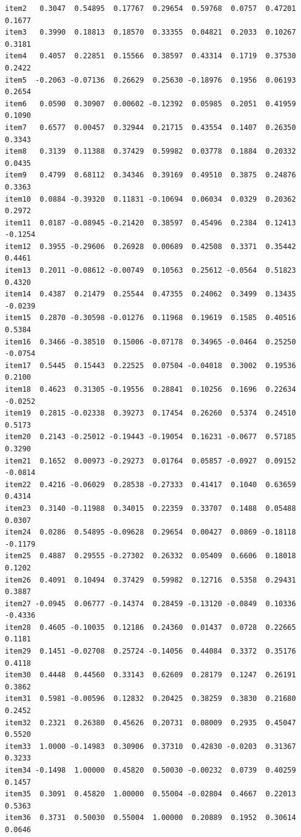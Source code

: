 \documentclass[
  a4paper,
]{ltjsbook}
\begin{document}
\begin{verbatim}
item2   0.3047  0.54895  0.17767  0.29654  0.59768  0.0757  0.47201  0.1677
item3   0.3990  0.18813  0.18570  0.33355  0.04821  0.2033  0.10267  0.3181
item4   0.4057  0.22851  0.15566  0.38597  0.43314  0.1719  0.37530  0.2422
item5  -0.2063 -0.07136  0.26629  0.25630 -0.18976  0.1956  0.06193  0.2654
item6   0.0590  0.30907  0.00602 -0.12392  0.05985  0.2051  0.41959  0.1090
item7   0.6577  0.00457  0.32944  0.21715  0.43554  0.1407  0.26350  0.3343
item8   0.3139  0.11388  0.37429  0.59982  0.03778  0.1884  0.20332  0.0435
item9   0.4799  0.68112  0.34346  0.39169  0.49510  0.3875  0.24876  0.3363
item10  0.0884 -0.39320  0.11831 -0.10694  0.06034  0.0329  0.20362  0.2972
item11  0.0187 -0.08945 -0.21420  0.38597  0.45496  0.2384  0.12413 -0.1254
item12  0.3955 -0.29606  0.26928  0.00689  0.42508  0.3371  0.35442  0.4461
item13  0.2011 -0.08612 -0.00749  0.10563  0.25612 -0.0564  0.51823  0.4320
item14  0.4387  0.21479  0.25544  0.47355  0.24062  0.3499  0.13435 -0.0239
item15  0.2870 -0.30598 -0.01276  0.11968  0.19619  0.1585  0.40516  0.5384
item16  0.3466 -0.38510  0.15006 -0.07178  0.34965 -0.0464  0.25250 -0.0754
item17  0.5445  0.15443  0.22525  0.07504 -0.04018  0.3002  0.19536  0.2100
item18  0.4623  0.31305 -0.19556  0.28841  0.10256  0.1696  0.22634 -0.0252
item19  0.2815 -0.02338  0.39273  0.17454  0.26260  0.5374  0.24510  0.5173
item20  0.2143 -0.25012 -0.19443 -0.19054  0.16231 -0.0677  0.57185  0.3290
item21  0.1652  0.00973 -0.29273  0.01764  0.05857 -0.0927  0.09152 -0.0814
item22  0.4216 -0.06029  0.28538 -0.27333  0.41417  0.1040  0.63659  0.4314
item23  0.3140 -0.11988  0.34015  0.22359  0.33707  0.1488  0.05488  0.0307
item24  0.0286  0.54895 -0.09628  0.29654  0.00427  0.0869 -0.18118 -0.1179
item25  0.4887  0.29555 -0.27302  0.26332  0.05409  0.6606  0.18018  0.1202
item26  0.4091  0.10494  0.37429  0.59982  0.12716  0.5358  0.29431  0.3887
item27 -0.0945  0.06777 -0.14374  0.28459 -0.13120 -0.0849  0.10336 -0.4336
item28  0.4605 -0.10035  0.12186  0.24360  0.01437  0.0728  0.22665  0.1181
item29  0.1451 -0.02708  0.25724 -0.14056  0.44084  0.3372  0.35176  0.4118
item30  0.4448  0.44560  0.33143  0.62609  0.28179  0.1247  0.26191  0.3862
item31  0.5981 -0.00596  0.12832  0.20425  0.38259  0.3830  0.21680  0.2452
item32  0.2321  0.26380  0.45626  0.20731  0.08009  0.2935  0.45047  0.5520
item33  1.0000 -0.14983  0.30906  0.37310  0.42830 -0.0203  0.31367  0.3233
item34 -0.1498  1.00000  0.45820  0.50030 -0.00232  0.0739  0.40259  0.1457
item35  0.3091  0.45820  1.00000  0.55004 -0.02804  0.4667  0.22013  0.5363
item36  0.3731  0.50030  0.55004  1.00000  0.20889  0.1952  0.30614  0.0646

\end{verbatim}
\end{document}
